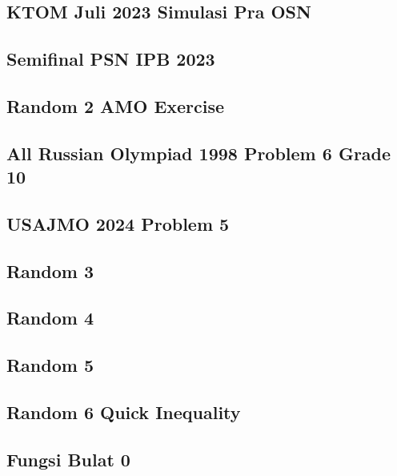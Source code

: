 \subsection{KTOM Juli 2023 Simulasi Pra OSN}

\newpage

\subsection{Semifinal PSN IPB 2023}

\newpage

\subsection{Random 2 AMO Exercise}

\newpage

\subsection{All Russian Olympiad 1998 Problem 6 Grade 10}

\newpage

\subsection{USAJMO 2024 Problem 5}

\newpage

\subsection{Random 3}

\newpage

\subsection{Random 4}

\newpage

\subsection{Random 5}

\newpage

\subsection{Random 6 Quick Inequality}

\newpage

\subsection{Fungsi Bulat 0}

\newpage

